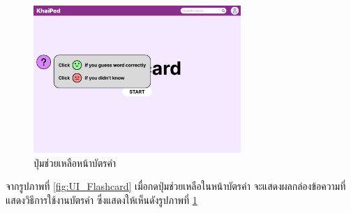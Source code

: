 \documentclass[12pt,oneside,openright,a4paper]{cpe-thai-project}
\begin{document}
\begin{figure}[!h]\centering
	\includegraphics[width=0.7\textwidth, keepaspectratio=true]{image/chap3/ui/flashcard/Flashcard - Help.png}
	\caption{ปุ่มช่วยเหลือหน้าบัตรคำ}\label{fig:UI_FlashcardHelp}
\end{figure}
\hspace{1cm}
จากรูปภาพที่ \ref{fig:UI_Flashcard} เมื่อกดปุ่มช่วยเหลือในหน้าบัตรคำ จะแสดงผลกล่องข้อความที่แสดงวิธีการใช้งานบัตรคำ ซึ่งแสดงให้เห็นดังรูปภาพที่ \ref{fig:UI_FlashcardHelp}


\end{document}
